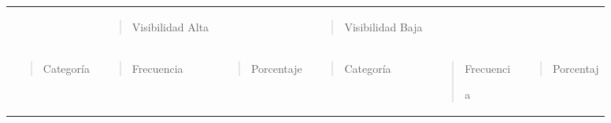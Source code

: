\documentclass[
]{interact}
\begin{document}
\begin{longtable}[]{@{}
  >{\raggedright\arraybackslash}p{}
  >{\raggedright\arraybackslash}p{}
  >{\raggedright\arraybackslash}p{}
  >{\raggedright\arraybackslash}p{}
  >{\raggedright\arraybackslash}p{}
  >{\raggedright\arraybackslash}p{}@{}}
\toprule\noalign{}
\endhead
\bottomrule\noalign{}
\endlastfoot
& \begin{minipage}[t]{\linewidth}\raggedright
\begin{quote}
Visibilidad Alta
\end{quote}
\end{minipage} & & \begin{minipage}[t]{\linewidth}\raggedright
\begin{quote}
Visibilidad Baja
\end{quote}
\end{minipage} & & \\
\begin{minipage}[t]{\linewidth}\raggedright
\begin{quote}
Categoría
\end{quote}
\end{minipage} & \begin{minipage}[t]{\linewidth}\raggedright
\begin{quote}
Frecuencia
\end{quote}
\end{minipage} & \begin{minipage}[t]{\linewidth}\raggedright
\begin{quote}
Porcentaje
\end{quote}
\end{minipage} & \begin{minipage}[t]{\linewidth}\raggedright
\begin{quote}
Categoría
\end{quote}
\end{minipage} & \begin{minipage}[t]{\linewidth}\raggedright
\begin{quote}
Frecuenci

a
\end{quote}
\end{minipage} & \begin{minipage}[t]{\linewidth}\raggedright
\begin{quote}
Porcentaj


\end{quote}
\end{minipage}
\end{longtable}
\end{document}
